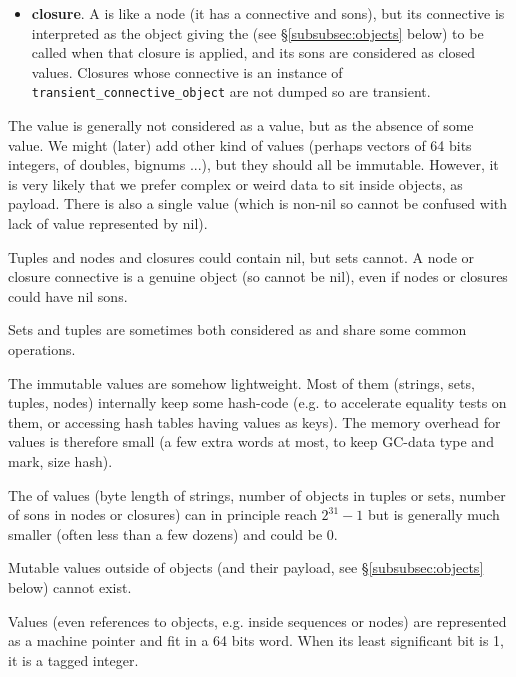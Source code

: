 \begin{itemize}
  \item \textbf{closure}. A  is like a node
    (it has a connective and sons), but its connective is interpreted
    as the object giving the  (see
    \S\ref{subsubsec:objects} below) to be called when that closure is
    applied, and its sons are considered as closed values. Closures
    whose connective is an instance of 
    \texttt{transient\_connective\_object} are not dumped so are
    transient.
        
\end{itemize}

The  value is generally not considered as a
value, but as the absence of some value. We might (later) add other
kind of values (perhaps vectors of 64 bits integers, of doubles,
bignums ...), but they should all be immutable. However, it is very
likely that we prefer complex or weird data to sit inside objects, as
payload. There is also a single
 value (which is non-nil so
cannot be confused with lack of value represented by nil).

Tuples and nodes and closures could contain nil, but sets cannot. A
node or closure connective is a genuine object (so cannot be nil),
even if nodes or closures could have nil sons.

Sets and tuples are sometimes both considered as
 and share some common operations.

The immutable values are somehow lightweight. Most of them (strings,
sets, tuples, nodes) internally keep some hash-code (e.g. to
accelerate equality tests on them, or accessing hash tables having
values as keys). The memory overhead for values is therefore small (a
few extra words at most, to keep GC-data type and mark, size hash).

The  of values (byte length of strings, number of objects in
tuples or sets, number of sons in nodes or closures) can in principle reach
$2^{31} - 1$ but is generally much smaller (often less than a few
dozens) and could be 0.

Mutable values outside of objects (and their payload, see
\S\ref{subsubsec:objects} below) cannot exist.

Values (even references to objects, e.g. inside sequences or nodes)
are represented as a machine pointer and fit in a 64 bits word. When
its least significant bit is 1, it is a tagged integer.

